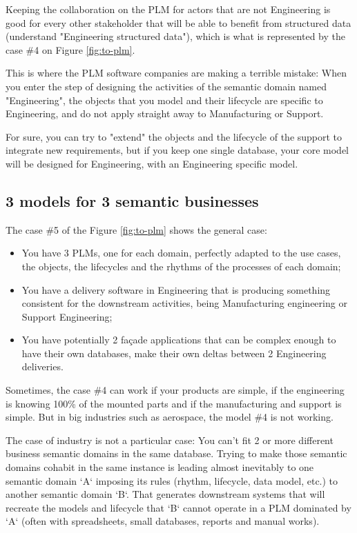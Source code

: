 \documentclass[]{article}
\begin{document}
Keeping the collaboration on the PLM for actors that are not Engineering is good for every other stakeholder that will be able to benefit from structured data (understand "Engineering structured data"), which is what is represented by the case \#4 on Figure \ref{fig:to-plm}.

This is where the PLM software companies are making a terrible mistake: When you enter the step of designing the activities of the semantic domain named "Engineering", the objects that you model and their lifecycle are specific to Engineering, and do not apply straight away to Manufacturing or Support.

For sure, you can try to "extend" the objects and the lifecycle of the support to integrate new requirements, but if you keep one single database, your core model will be designed for Engineering, with an Engineering specific model.

\subsection{3 models for 3 semantic businesses}

The case \#5 of the Figure \ref{fig:to-plm} shows the general case:

\begin{itemize}
\item You have 3 PLMs, one for each domain, perfectly adapted to the use cases, the objects, the lifecycles and the rhythms of the processes of each domain;
\item You have a delivery software in Engineering that is producing something consistent for the downstream activities, being Manufacturing engineering or Support Engineering;
\item You have potentially 2 façade applications that can be complex enough to have their own databases, make their own deltas between 2 Engineering deliveries.
\end{itemize}

Sometimes, the case \#4 can work if your products are simple, if the engineering is knowing 100\% of the mounted parts and if the manufacturing and support is simple. But in big industries such as aerospace, the model \#4 is not working.

The case of industry is not a particular case: You can't fit 2 or more different business semantic domains in the same database. Trying to make those semantic domains cohabit in the same instance is leading almost inevitably to one semantic domain `A` imposing its rules (rhythm, lifecycle, data model, etc.) to another semantic domain `B`. That generates downstream systems that will recreate the models and lifecycle that `B` cannot operate in a PLM dominated by `A` (often with spreadsheets, small databases, reports and manual works).
\end{document}
